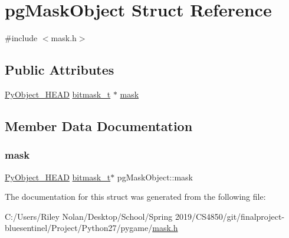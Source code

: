 \hypertarget{structpg_mask_object}{}\section{pg\+Mask\+Object Struct Reference}
\label{structpg_mask_object}


{\ttfamily \#include $<$mask.\+h$>$}

\subsection*{Public Attributes}
\begin{DoxyCompactItemize}
\item 
\mbox{\hyperlink{_python27_2object_8h_a0bf35c1f3ea13f925de94d8593db3b7e}{Py\+Object\+\_\+\+H\+E\+AD}} \mbox{\hyperlink{bitmask_8h_a1a22740a2084764b6414a23d29c065a9}{bitmask\+\_\+t}} $\ast$ \mbox{\hyperlink{structpg_mask_object_a6c07cf328696dd476bb1afbdcfb8563c}{mask}}
\end{DoxyCompactItemize}


\subsection{Member Data Documentation}
\mbox{\label{structpg_mask_object_a6c07cf328696dd476bb1afbdcfb8563c}} 
\subsubsection{\texorpdfstring{mask}{mask}}
{\footnotesize\ttfamily \mbox{\hyperlink{_python27_2object_8h_a0bf35c1f3ea13f925de94d8593db3b7e}{Py\+Object\+\_\+\+H\+E\+AD}} \mbox{\hyperlink{bitmask_8h_a1a22740a2084764b6414a23d29c065a9}{bitmask\+\_\+t}}$\ast$ pg\+Mask\+Object\+::mask}



The documentation for this struct was generated from the following file\+:\begin{DoxyCompactItemize}
\item 
C\+:/\+Users/\+Riley Nolan/\+Desktop/\+School/\+Spring 2019/\+C\+S4850/git/finalproject-\/bluesentinel/\+Project/\+Python27/pygame/\mbox{\hyperlink{mask_8h}{mask.\+h}}\end{DoxyCompactItemize}
